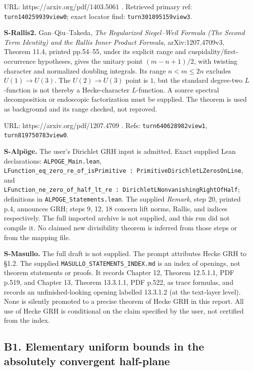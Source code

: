\documentclass[11pt,a4paper]{article}
\theoremstyle{definition}
\begin{document}
URL: https://arxiv.org/pdf/1403.5061 . Retrieved primary ref:
\texttt{turn140259939view0}; exact locator find:
\texttt{turn301895159view3}.

\textbf{S-Rallis2.} Gan--Qiu--Takeda, \emph{The Regularized Siegel--Weil
Formula (The Second Term Identity) and the Rallis Inner Product
Formula}, arXiv:1207.4709v3, Theorem 11.4, printed pp.54--55, under its
explicit range and cuspidality/first-occurrence hypotheses, gives the
unitary point \((m-n+1)/2\), with twisting character and normalized
doubling integrals. Its range \(n<m\leq2n\) excludes \(U(1)\to U(3)\).
The \(U(2)\to U(3)\) point is \(1\), but the standard degree-two
\(L\)-function is not thereby a Hecke-character \(L\)-function. A source
spectral decomposition or endoscopic factorization must be supplied. The
theorem is used as background and its range checked, not reproved.

URL: https://arxiv.org/pdf/1207.4709 . Refs:
\texttt{turn640628982view1}, \texttt{turn819750783view0}.

\textbf{S-Alpöge.} The user's Dirichlet GRH input is admitted. Exact
supplied Lean declarations: \texttt{ALPOGE\_Main.lean},
\texttt{LFunction\_eq\_zero\_re\_of\_isPrimitive\ :\ PrimitiveDirichletLZerosOnLine},
and
\texttt{LFunction\_ne\_zero\_of\_half\_lt\_re\ :\ DirichletLNonvanishingRightOfHalf};
definitions in \texttt{ALPOGE\_Statements.lean}. The supplied
\emph{Remark}, step 20, printed p.4, announces GRH; steps 9, 12, 18
concern lift norms, Rallis, and indices respectively. The full imported
archive is not supplied, and this run did not compile it. No claimed new
divisibility theorem is inferred from those steps or from the mapping
file.

\textbf{S-Masullo.} The full draft is not supplied. The prompt
attributes Hecke GRH to §1.2. The supplied
\texttt{MASULLO\_STATEMENTS\_INDEX.md} is an index of openings, not
theorem statements or proofs. It records Chapter 12, Theorem 12.5.1.1,
PDF p.519, and Chapter 13, Theorem 13.3.1.1, PDF p.522, as trace
formulas, and records an unfinished-looking opening labelled 13.3.1.2
(at the text-layer level). None is silently promoted to a precise
theorem of Hecke GRH in this report. All use of Hecke GRH is conditional
on the claim specified by the user, not certified from the index.

\subsection{B1. Elementary uniform bounds in the absolutely convergent
half-plane}\label{b1.-elementary-uniform-bounds-in-the-absolutely-convergent-half-plane}
\end{document}
